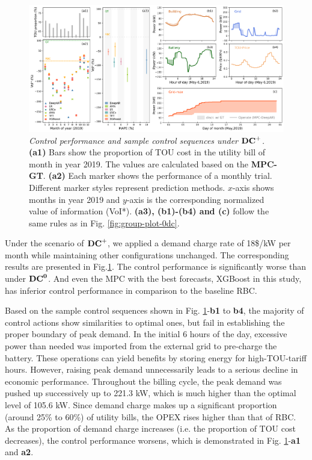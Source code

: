 \begin{figure}[!ht]
\centering
  \includegraphics[width=1\textwidth]{figures/fig-3-with-dc-3.png}
  \caption{\textit{Control performance and sample control sequences under $\mathbf{{DC}^{+}}$.} \textbf{(a1)} Bars show the proportion of TOU cost in the utility bill of month in year 2019. The values are calculated based on the \textbf{MPC-GT}. \textbf{(a2)} Each marker shows the performance of a monthly trial. Different marker styles represent prediction methods. $x$-axis shows months in year 2019 and $y$-axis is the corresponding normalized value of information (VoI*). \textbf{(a3), (b1)-(b4) and (c)} follow the same rules as in Fig. \ref{fig:group-plot-0dc}.}
  \label{fig:group-plot-dc}
\end{figure}


Under the scenario of $\mathbf{{DC}^{+}}$, we applied a demand charge rate of 18\$/kW per month while maintaining other configurations unchanged. The corresponding results are presented in Fig.\ref{fig:group-plot-dc}. The control performance is significantly worse than under $\mathbf{{DC}^{0}}$. And even the MPC with the best forecasts, XGBoost in this study, has inferior control performance in comparison to the baseline RBC. 

Based on the sample control sequences shown in Fig. \ref{fig:group-plot-dc}-\textbf{b1} to \textbf{b4}, the majority of control actions show similarities to optimal ones, but fail in establishing the proper boundary of peak demand. In the initial 6 hours of the day, excessive power than needed was imported from the external grid to pre-charge the battery. These operations can yield benefits by storing energy for high-TOU-tariff hours. However, raising peak demand unnecessarily leads to a serious decline in economic performance. Throughout the billing cycle, the peak demand was pushed up successively up to 221.3 kW, which is much higher than the optimal level of 105.6 kW. 
Since demand charge makes up a significant proportion (around 25\% to 60\%) of utility bills, the OPEX rises higher than that of RBC. As the proportion of demand charge increases (i.e. the proportion of TOU cost decreases), the control performance worsens, which is demonstrated in Fig. \ref{fig:group-plot-dc}-\textbf{a1} and \textbf{a2}.


